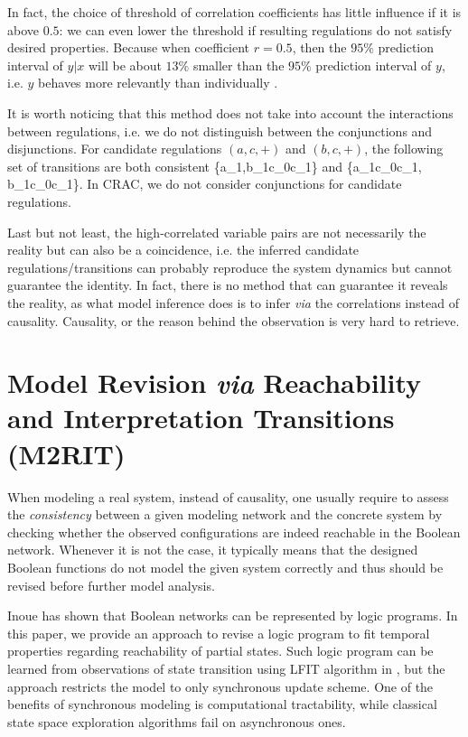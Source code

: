 In fact, the choice of threshold of correlation coefficients has little influence if it is above $0.5$: we can even lower the threshold if resulting regulations do not satisfy desired properties.
Because when coefficient $r =0.5$, then the $95\%$ prediction interval of $y|x$ will be about $13\%$ smaller than the $95\%$ prediction interval of $y$, i.e. $y$ behaves more relevantly than individually \cite{hull1927correlation}.

It is worth noticing that this method does not take into account the interactions between regulations, i.e. we do not distinguish between the conjunctions and disjunctions.
For candidate regulations $(a,c,+)$ and $(b,c,+)$, the following set of transitions are both consistent \{\ac{a_1,b_1}{c_0}{c_1}\} and \{\ac{a_1}{c_0}{c_1}, \ac{b_1}{c_0}{c_1}\}.
In CRAC, we do not consider conjunctions for candidate regulations.

Last but not least, the high-correlated variable pairs are not necessarily the reality but can also be a coincidence, i.e. the inferred candidate regulations/transitions can probably reproduce the system dynamics but cannot guarantee the identity.
In fact, there is no method that can guarantee it reveals the reality, as what model inference does is to infer \textit{via} the correlations instead of causality.
Causality, or the reason behind the observation is very hard to retrieve.

\section{Model Revision \textit{via} Reachability and Interpretation Transitions (M2RIT)}
When modeling a real system, instead of causality, one usually require to assess the \textit{consistency} between a given modeling network and the concrete system by checking whether the observed configurations are indeed reachable in the Boolean network.
Whenever it is not the case, it typically means that the designed Boolean functions do not model the given system correctly and thus should be revised before further model analysis.

Inoue \cite{inoue2011logic} has shown that Boolean networks can be represented by logic programs.
In this paper, we provide an approach to revise a logic program to fit temporal properties regarding reachability of partial states.
%
Such logic program can be learned from observations of state transition using LFIT algorithm in \cite{ribeiro2015learning}, but the approach restricts the model to only synchronous update scheme.
One of the benefits of synchronous modeling is computational tractability, while classical state space exploration algorithms fail on asynchronous ones.

